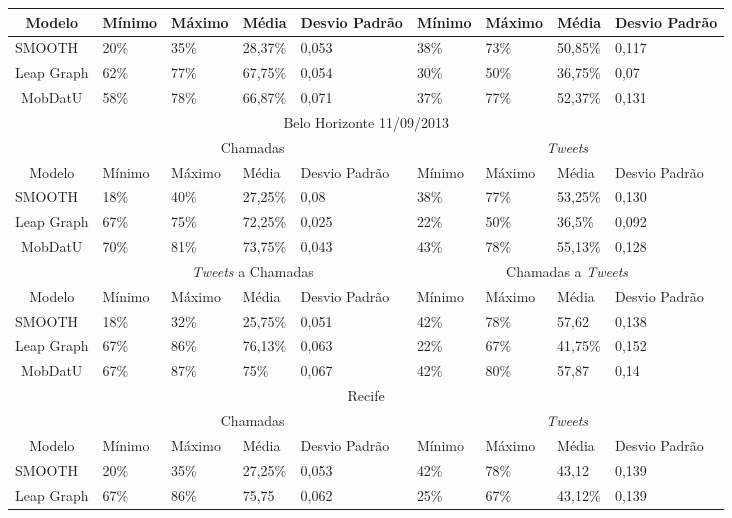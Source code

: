 \documentclass[10pt, a4paper, onecolumn, conference, compsocconf]{IEEEtran}
\begin{document}
\begin{table}[httt!]
\begin{tabular}{|c|p{1.0cm}|p{1.0cm}|p{1.0cm}|p{1.0cm}|p{1.0cm}|p{1.0cm}|p{1.0cm}|p{1.0cm}|}
\cline{2-9} 
Modelo & Mínimo & Máximo & Média & Desvio Padrão & Mínimo & Máximo & Média & Desvio Padrão \\
\hline
\multicolumn{1}{|l|}{SMOOTH} & 20\% & 35\% & 28,37\% & 0,053 & 38\% & 73\% & 50,85\% & 0,117\\
\multicolumn{1}{|l|}{Leap Graph} & 62\% & 77\% & 67,75\% & 0,054 & 30\% & 50\% & 36,75\% & 0,07\\
\multicolumn{1}{|1|}{MobDatU} & 58\% & 78\% & 66,87\% & 0,071 & 37\% & 77\% & 52,37\% & 0,131\\ 
\cline{1-9}
\hline
\multicolumn{9}{|c|}{Belo Horizonte 11/09/2013} \\ \hline
& \multicolumn{4}{|c|}{Chamadas} & \multicolumn{4}{|c|}{\textit{Tweets}} \\
\cline{2-9} 
Modelo & Mínimo & Máximo & Média & Desvio Padrão & Mínimo & Máximo & Média & Desvio Padrão \\
\hline
\multicolumn{1}{|l|}{SMOOTH} & 18\% & 40\% & 27,25\% & 0,08 & 38\% & 77\% & 53,25\% & 0,130 \\
\multicolumn{1}{|l|}{Leap Graph} & 67\%  & 75\% & 72,25\% & 0,025 & 22\% & 50\% & 36,5\% & 0,092\\
\multicolumn{1}{|1|}{MobDatU} & 70\% & 81\% & 73,75\% & 0,043 & 43\% & 78\% & 55,13\% & 0,128\\ 
\cline{1-9} 
& \multicolumn{4}{|c|}{\textit{Tweets} a Chamadas} & \multicolumn{4}{|c|}{Chamadas a \textit{Tweets}}  \\
\cline{2-9} 
Modelo & Mínimo & Máximo & Média & Desvio Padrão & Mínimo & Máximo & Média & Desvio Padrão \\
\hline
\multicolumn{1}{|l|}{SMOOTH} & 18\% & 32\% & 25,75\% & 0,051 & 42\% & 78\% & 57,62 & 0,138 \\
\multicolumn{1}{|l|}{Leap Graph} & 67\% & 86\% & 76,13\% & 0,063 & 22\% & 67\% & 41,75\% & 0,152\\
\multicolumn{1}{|1|}{MobDatU} & 67\% & 87\% & 75\% & 0,067 & 42\% & 80\% & 57,87 & 0,14\\ 
\cline{1-9}
\hline
\multicolumn{9}{|c|}{Recife} \\ \hline
& \multicolumn{4}{|c|}{Chamadas}  & \multicolumn{4}{|c|}{\textit{Tweets}} \\
\cline{2-9} 
Modelo & Mínimo & Máximo & Média & Desvio Padrão & Mínimo & Máximo & Média & Desvio Padrão \\
\hline
\multicolumn{1}{|l|}{SMOOTH} & 20\% & 35\% & 27,25\% & 0,053 & 42\% & 78\% & 43,12 & 0,139 \\
\multicolumn{1}{|l|}{Leap Graph} & 67\% & 86\% & 75,75 & 0,062 & 25\% & 67\% & 43,12\% & 0,139\\

\end{tabular}
\end{table}
\end{document}
